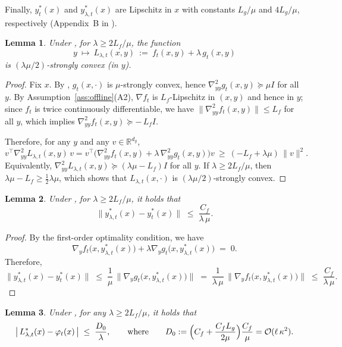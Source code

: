\documentclass{uai2026} %
\newtheorem{lemma}{Lemma}[section]
\begin{document}
Finally, $y^{*}_t(x)$ and $y^{*}_{\lambda,t}(x)$ are Lipschitz in $x$ with constants $L_g/\mu$ and $4L_g/\mu$, respectively (Appendix~B in \cite{ChenMaZhang2025}).

\begin{lemma}
\label{lem:B1}
Under , for $\lambda \ge 2L_f/\mu$, the function
\[
y \ \longmapsto \ L_{\lambda,t}(x,y)\ :=\ f_{t}(x,y)+\lambda\,g_{t}(x,y)
\]
is $(\lambda\mu/2)$-strongly convex (in $y$).
\end{lemma}

\begin{proof}
Fix $x$. By , $g_{t}(x,\cdot)$ is $\mu$-strongly convex, hence
$\nabla^2_{yy} g_{t}(x,y) \succeq \mu I$ for all $y$. By Assumption~\ref{ass:offline}(A2), $\nabla f_{t}$ is
$L_f$-Lipschitz in $(x,y)$ and hence in $y$; since $f_{t}$ is twice continuously differentiable, we have
$\|\nabla^2_{yy} f_{t}(x,y)\|\le L_f$ for all $y$, which implies
$\nabla^2_{yy} f_{t}(x,y) \succeq -\,L_f I$.

Therefore, for any $y$ and any $v\in\mathbb{R}^{d_y}$,
\[
v^\top \nabla^2_{yy} L_{\lambda,t}(x,y)\, v
= v^\top\!\Big(\nabla^2_{yy} f_{t}(x,y)+\lambda\,\nabla^2_{yy} g_{t}(x,y)\Big) v
\ \ge\ (-L_f+\lambda\mu)\,\|v\|^2.
\]
Equivalently, $\nabla^2_{yy} L_{\lambda,t}(x,y) \succeq (\lambda\mu-L_f) I$ for all $y$.
If $\lambda \ge 2L_f/\mu$, then $\lambda\mu-L_f \ge \tfrac{1}{2}\lambda\mu$, which
shows that $L_{\lambda,t}(x,\cdot)$ is $(\lambda\mu/2)$-strongly convex.
\end{proof}
\begin{lemma}
\label{lem:B2}
Under , for $\lambda \ge 2L_f/\mu$, it holds that
\[
\bigl\|y^*_{\lambda,t}(x) - y^*_{t}(x)\bigr\| \;\le\; \frac{C_f}{\lambda\,\mu}.
\]
\end{lemma}
\begin{proof}
By the first-order optimality condition, we have
\[
\nabla_y f_{t}\bigl(x, y^*_{\lambda,t}(x)\bigr) + \lambda \nabla_y g_{t}\bigl(x, y^*_{\lambda,t}(x)\bigr) \;=\; 0.
\]
Therefore,
\[
\bigl\|y^*_{\lambda,t}(x) - y^*_{t}(x)\bigr\|
\;\le\; \frac{1}{\mu}\,\bigl\|\nabla_y g_{t}\bigl(x, y^*_{\lambda,t}(x)\bigr)\bigr\|
\;=\; \frac{1}{\lambda\,\mu}\,\bigl\|\nabla_y f_{t}\bigl(x, y^*_{\lambda,t}(x)\bigr)\bigr\|
\;\le\; \frac{C_f}{\lambda\,\mu}.
\]
\end{proof}


\begin{lemma}
\label{lem:B3}
Under , for any $\lambda \ge 2L_f/\mu$, it holds that
\[
\bigl|\,L^*_{\lambda,t}(x) - \varphi_{t}(x)\,\bigr| \;\le\; \frac{D_0}{\lambda},
\qquad\text{where}\qquad
D_0 := \Bigl(C_f + \frac{C_f L_g}{2\mu}\Bigr)\frac{C_f}{\mu}
= \mathcal{O}(\ell\,\kappa^2).
\]
\end{lemma}
\end{document}
